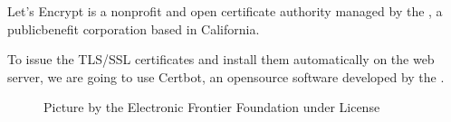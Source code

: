 \documentclass[letterpaper,10pt,english]{sphinxmanual}
\begin{document}
\sphinxAtStartPar
Let’s Encrypt is a non\sphinxhyphen{}profit and open certificate authority managed by the , a public\sphinxhyphen{}benefit corporation based in California.

\sphinxAtStartPar
To issue the TLS/SSL certificates and install them automatically on the web server, we are going to use Certbot, an open\sphinxhyphen{}source software developed by the .

\begin{figure}[htbp]
\centering
\capstart

\noindent{}
\caption{Picture by the Electronic Frontier Foundation under  License}\label{\detokenize{joomla-to-vps:id3}}\end{figure}
\end{document}
